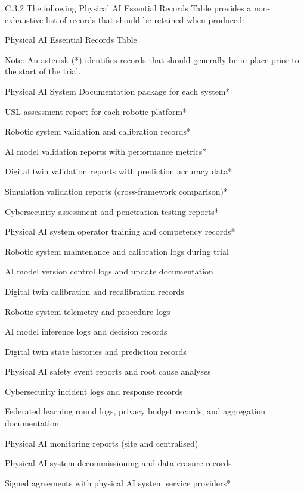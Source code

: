 \documentclass[11pt]{article}
\begin{document}
C.3.2 The following Physical AI Essential Records Table provides a non-exhaustive list of records that should be retained when produced:

Physical AI Essential Records Table

Note: An asterisk (*) identifies records that should generally be in place prior to the start of the trial.

\begin{description}[leftmargin=0.5cm,style=sameline]

\item[--] Physical AI System Documentation package for each system*
\item[--] USL assessment report for each robotic platform*
\item[--] Robotic system validation and calibration records*
\item[--] AI model validation reports with performance metrics*
\item[--] Digital twin validation reports with prediction accuracy data*
\item[--] Simulation validation reports (cross-framework comparison)*
\item[--] Cybersecurity assessment and penetration testing reports*
\item[--] Physical AI system operator training and competency records*
\item[--] Robotic system maintenance and calibration logs during trial
\item[--] AI model version control logs and update documentation
\item[--] Digital twin calibration and recalibration records
\item[--] Robotic system telemetry and procedure logs
\item[--] AI model inference logs and decision records
\item[--] Digital twin state histories and prediction records
\item[--] Physical AI safety event reports and root cause analyses
\item[--] Cybersecurity incident logs and response records
\item[--] Federated learning round logs, privacy budget records, and aggregation documentation
\item[--] Physical AI monitoring reports (site and centralised)
\item[--] Physical AI system decommissioning and data erasure records
\item[--] Signed agreements with physical AI system service providers*

\end{description}
\end{document}
